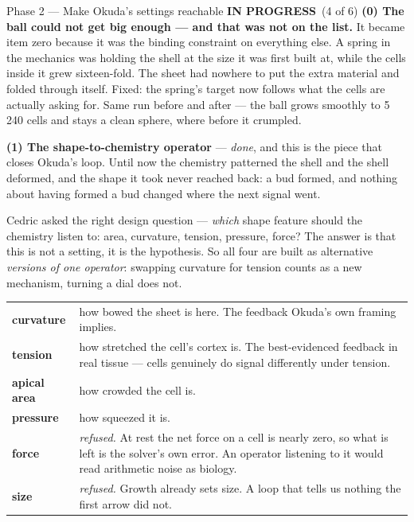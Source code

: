 \documentclass[11pt,a4paper]{article}
\newcommand{\prog}{\textcolor{warn}{\textbf{IN PROGRESS}}}
\begin{document}
\begin{phasebox}{Phase 2 --- Make Okuda's settings reachable \hfill \prog\ (4 of 6)}
\textbf{(0) The ball could not get big enough --- and that was not on the list.} It became item
zero because it was the binding constraint on everything else. A spring in the mechanics was
holding the shell at the size it was first built at, while the cells inside it grew sixteen-fold.
The sheet had nowhere to put the extra material and folded through itself. Fixed: the spring's
target now follows what the cells are actually asking for. Same run before and after --- the ball
grows smoothly to 5\,240 cells and stays a clean sphere, where before it crumpled.

\textbf{(1) The shape-to-chemistry operator} --- \emph{done}, and this is the piece that closes
Okuda's loop. Until now the chemistry patterned the shell and the shell deformed, and the shape it
took never reached back: a bud formed, and nothing about having formed a bud changed where the next
signal went.

Cedric asked the right design question --- \emph{which} shape feature should the chemistry listen
to: area, curvature, tension, pressure, force? The answer is that this is not a setting, it is the
hypothesis. So all four are built as alternative \emph{versions of one operator}: swapping
curvature for tension counts as a new mechanism, turning a dial does not.

\begin{center}\small
\begin{tabular}{@{}lp{9.4cm}@{}}
\toprule
\textbf{curvature}   & how bowed the sheet is here. The feedback Okuda's own framing implies.\\
\textbf{tension}     & how stretched the cell's cortex is. The best-evidenced feedback in real
                       tissue --- cells genuinely do signal differently under tension.\\
\textbf{apical area} & how crowded the cell is.\\
\textbf{pressure}    & how squeezed it is.\\
\midrule
\textbf{force}       & \emph{refused.} At rest the net force on a cell is nearly zero, so what is
                       left is the solver's own error. An operator listening to it would read
                       arithmetic noise as biology.\\
\textbf{size}        & \emph{refused.} Growth already sets size. A loop that tells us nothing the
                       first arrow did not.\\
\bottomrule
\end{tabular}
\end{center}


\end{phasebox}
\end{document}
